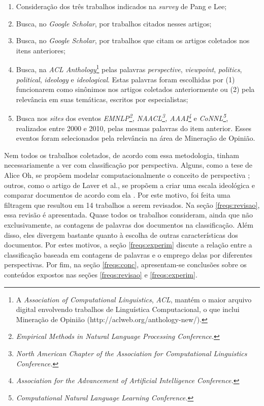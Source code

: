 \begin{enumerate}
\item Consideração dos três trabalhos indicados na \emph{survey} de Pang e Lee;
\item Busca, no \emph{Google Scholar}, por trabalhos citados nesses artigos;
\item Busca, no \emph{Google Scholar}, por trabalhos que citam os artigos coletados nos itens anteriores;
\item Busca, na \emph{ACL Anthology}\footnote{A \emph{Association of Computational Linguistics}, \emph{ACL}, mantém o maior arquivo digital envolvendo trabalhos de Linguística Computacional, o que inclui Mineração de Opinião (http://aclweb.org/anthology-new/).} pelas palavras \emph{perspective}, \emph{viewpoint}, \emph{politics}, \emph{political}, \emph{ideology} e \emph{ideological}. Estas palavras foram escolhidas por (1) funcionarem como sinônimos nos artigos coletados anteriormente ou (2) pela relevância em suas temáticas, escritos por especialistas;
\item Busca nos \emph{sites} dos eventos \emph{EMNLP\footnote{\emph{Empirical Methods in Natural Language Processing Conference.}}, NAACL\footnote{\emph{North American Chapter of the Association for Computational Linguistics Conference.}}, AAAI\footnote{\emph{Association for the Advancement of Artificial Intelligence Conference.}}} e \emph{CoNNL\footnote{\emph{Computational Natural Language Learning Conference.}}}, realizados entre 2000 e 2010, pelas mesmas palavras do item anterior. Esses eventos foram selecionados pela relevância na área de Mineração de Opinião. 
\end{enumerate}

Nem todos os trabalhos coletados, de acordo com essa metodologia, tinham necessariamente a ver com classificação por perspectiva. Alguns, como a tese de Alice Oh, se propõem modelar computacionalmente o conceito de perspectiva \cite{alice-oh}; outros, como o artigo de Laver et al., se propõem a criar uma escala ideológica e comparar documentos de acordo com ela \cite{wordscores}.  Por este motivo, foi feita uma filtragem que resultou em 14 trabalhos a serem revisados. Na seção \ref{freqs:revisao}, essa revisão é apresentada. Quase todos os trabalhos consideram, ainda que não exclusivamente, as contagens de palavras dos documentos na classificação. Além disso, eles divergem bastante quanto à escolha de outras características dos documentos. Por estes motivos, a seção \ref{freqs:experim} discute a relação entre a classificação baseada em contagens de palavras e o emprego delas por diferentes perspectivas. Por fim, na seção \ref{freqs:conc}, apresentam-se conclusões sobre os conteúdos expostos nas seções \ref{freqs:revisao} e \ref{freqs:experim}. 

